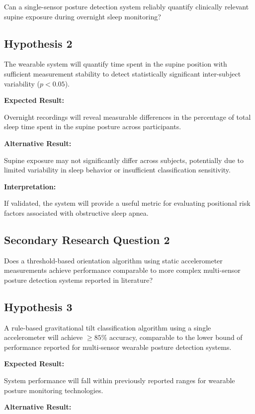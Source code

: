 \documentclass[10pt,journal]{IEEEtran}
\begin{document}
Can a single-sensor posture detection system reliably quantify clinically relevant supine exposure during overnight sleep monitoring?

\subsection{Hypothesis 2}

The wearable system will quantify time spent in the supine position with sufficient measurement stability to detect statistically significant inter-subject variability ($p < 0.05$).

\textbf{Expected Result:}

Overnight recordings will reveal measurable differences in the percentage of total sleep time spent in the supine posture across participants.

\textbf{Alternative Result:}

Supine exposure may not significantly differ across subjects, potentially due to limited variability in sleep behavior or insufficient classification sensitivity.

\textbf{Interpretation:}

If validated, the system will provide a useful metric for evaluating positional risk factors associated with obstructive sleep apnea.

\subsection{Secondary Research Question 2}

Does a threshold-based orientation algorithm using static accelerometer measurements achieve performance comparable to more complex multi-sensor posture detection systems reported in literature?

\subsection{Hypothesis 3}

A rule-based gravitational tilt classification algorithm using a single accelerometer will achieve $\geq 85\%$ accuracy, comparable to the lower bound of performance reported for multi-sensor wearable posture detection systems.

\textbf{Expected Result:}

System performance will fall within previously reported ranges for wearable posture monitoring technologies.

\textbf{Alternative Result:}
\end{document}
